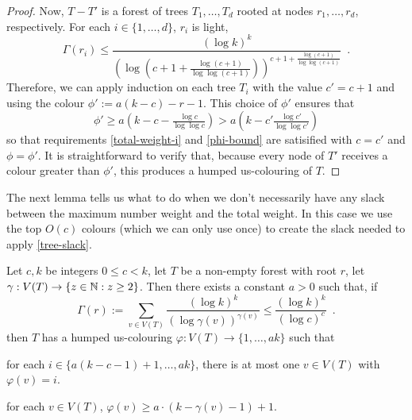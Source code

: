 \documentclass[kpfonts]{patmorin}
\begin{document}
\begin{proof}
   Now, $T-T'$ is a forest of trees $T_1,\ldots,T_d$ rooted at nodes $r_1,\ldots,r_d$, respectively. For each $i\in\{1,\ldots,d\}$, $r_i$ is light,
   \[
       \Gamma(r_i) \le \frac{(\log k)^k}{\left(\log\left(c+1+\tfrac{\log (c+1)}{\log\log (c+1)}\right)\right)^{c+1+\tfrac{\log (c+1)}{\log\log(c+1)}}} \enspace .
   \]
   Therefore, we can apply induction on each tree $T_i$ with the value $c'=c+1$ and using the colour
   $\phi':=a(k-c)-r-1$.  This choice of $\phi'$ ensures that
   \[
       \phi' \ge a\left(k-c-\tfrac{\log c}{\log\log c}\right) >  a\left(k-c'\tfrac{\log c'}{\log\log c'}\right)
   \]
   so that requirements \cref{total-weight-i} and \cref{phi-bound} are satisified with $c=c'$ and $\phi=\phi'$.  It is straightforward to verify that, because every node of $T'$ receives a colour greater than $\phi'$, this produces a humped us-colouring of $T$.
\end{proof}

The next lemma tells us what to do when we don't necessarily have any slack between the maximum number weight and the total weight.  In this case we use the top $O(c)$ colours (which we can only use once) to create the slack needed to apply \cref{tree-slack}.


\begin{lem}\label{tree-ii}
Let $c,k$ be integers $0\le c< k$, let $T$ be a non-empty forest with root $r$, let $\gamma:V(T)\to\{z\in\mathbb{N}:z\ge 2\}$.  Then there exists a constant $a>0$ such that,
if
\begin{equation}
   \Gamma(r):=\sum_{v\in V(T)} \frac{(\log k)^k}{(\log \gamma(v))^{\gamma(v)}} \le \frac{(\log k)^k}{(\log c)^c} \enspace . \label{total-weight-ii}
\end{equation}
then  $T$ has a humped us-colouring $\varphi:V(T)\to\{1,\ldots,ak\}$ such that
\begin{compactenum}[(P1)]
    \item for each $i\in\{a(k-c-1)+1,\ldots,ak\}$, there is at most one $v\in V(T)$ with $\varphi(v)=i$.
    \item for each $v\in V(T)$, $\varphi(v)\ge a\cdot(k-\gamma(v)-1)+1$.
\end{compactenum}
\end{lem}
\end{document}
